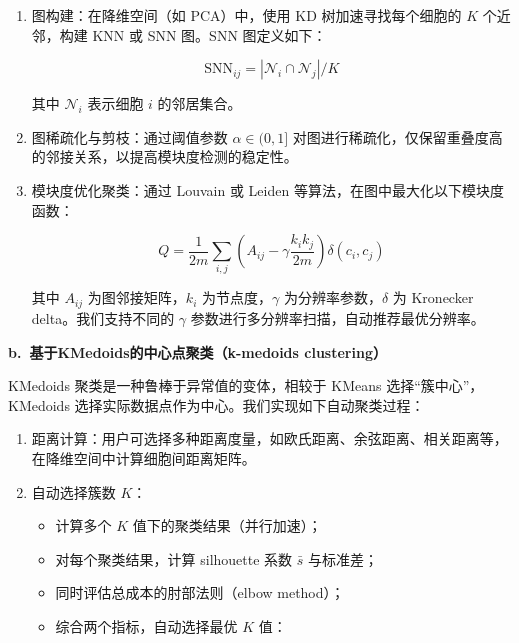 \begin{enumerate}
  \item 图构建：在降维空间（如 PCA）中，使用 KD 树加速寻找每个细胞的 $K$ 个近邻，构建 KNN 或 SNN 图。SNN 图定义如下：

\begin{equation}
  \text{SNN}_{ij} = |\mathcal{N}_i \cap \mathcal{N}_j| / K
\end{equation}

其中 $\mathcal{N}_i$ 表示细胞 $i$ 的邻居集合。

\item 图稀疏化与剪枝：通过阈值参数 $\alpha \in (0, 1]$ 对图进行稀疏化，仅保留重叠度高的邻接关系，以提高模块度检测的稳定性。

\item 模块度优化聚类：通过 Louvain 或 Leiden 等算法，在图中最大化以下模块度函数：

\begin{equation}
Q = \frac{1}{2m} \sum_{i,j} \left( A_{ij} - \gamma \frac{k_i k_j}{2m} \right) \delta(c_i, c_j)
\end{equation}

其中 $A_{ij}$ 为图邻接矩阵，$k_i$ 为节点度，$\gamma$ 为分辨率参数，$\delta$ 为 Kronecker delta。我们支持不同的 $\gamma$ 参数进行多分辨率扫描，自动推荐最优分辨率。

\end{enumerate}

\textbf{b.~基于KMedoids的中心点聚类（k-medoids clustering）}

KMedoids 聚类是一种鲁棒于异常值的变体，相较于 KMeans 选择“簇中心”，KMedoids 选择实际数据点作为中心。我们实现如下自动聚类过程：

\begin{enumerate}
  \item 距离计算：用户可选择多种距离度量，如欧氏距离、余弦距离、相关距离等，在降维空间中计算细胞间距离矩阵。

  \item 自动选择簇数 $K$：

  \begin{itemize}
    \item 计算多个 $K$ 值下的聚类结果（并行加速）；
    \item 对每个聚类结果，计算 silhouette 系数 $\bar{s}$ 与标准差；
    \item 同时评估总成本的肘部法则（elbow method）；
    \item 综合两个指标，自动选择最优 $K$ 值：
  \end{itemize}

\end{enumerate}

